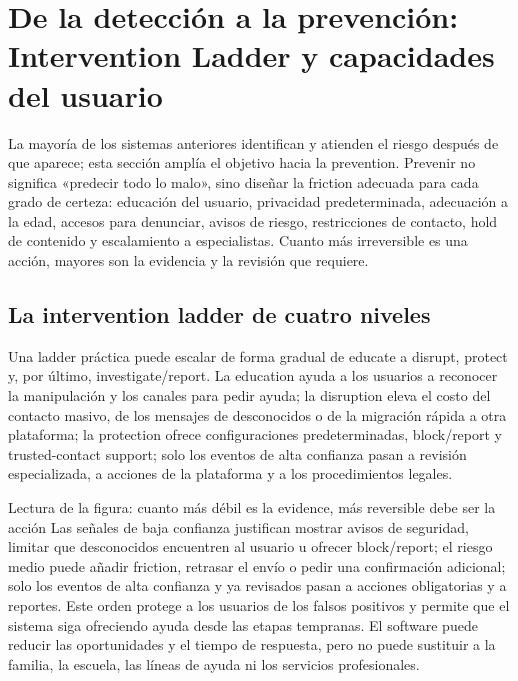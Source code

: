 \section{De la detección a la prevención: Intervention Ladder y capacidades del usuario}

La mayoría de los sistemas anteriores identifican y atienden el riesgo después de que aparece; esta sección amplía el objetivo hacia la prevention. Prevenir no significa «predecir todo lo malo», sino diseñar la friction adecuada para cada grado de certeza: educación del usuario, privacidad predeterminada, adecuación a la edad, accesos para denunciar, avisos de riesgo, restricciones de contacto, hold de contenido y escalamiento a especialistas. Cuanto más irreversible es una acción, mayores son la evidencia y la revisión que requiere.

\subsection{La intervention ladder de cuatro niveles}

Una ladder práctica puede escalar de forma gradual de educate a disrupt, protect y, por último, investigate/report. La education ayuda a los usuarios a reconocer la manipulación y los canales para pedir ayuda; la disruption eleva el costo del contacto masivo, de los mensajes de desconocidos o de la migración rápida a otra plataforma; la protection ofrece configuraciones predeterminadas, block/report y trusted-contact support; solo los eventos de alta confianza pasan a revisión especializada, a acciones de la plataforma y a los procedimientos legales.


\begin{knowledgebox}{Lectura de la figura: cuanto más débil es la evidence, más reversible debe ser la acción}
Las señales de baja confianza justifican mostrar avisos de seguridad, limitar que desconocidos encuentren al usuario u ofrecer block/report; el riesgo medio puede añadir friction, retrasar el envío o pedir una confirmación adicional; solo los eventos de alta confianza y ya revisados pasan a acciones obligatorias y a reportes. Este orden protege a los usuarios de los falsos positivos y permite que el sistema siga ofreciendo ayuda desde las etapas tempranas. El software puede reducir las oportunidades y el tiempo de respuesta, pero no puede sustituir a la familia, la escuela, las líneas de ayuda ni los servicios profesionales.
\end{knowledgebox}

